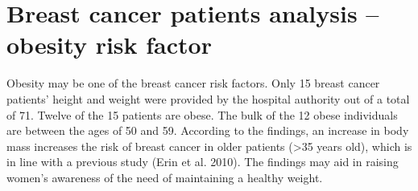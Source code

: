 \documentclass[10pt,a4paper,twoside]{article}
\begin{document}
\section{Breast cancer patients analysis – obesity risk factor}

Obesity may be one of the breast cancer risk factors.
Only 15 breast cancer patients' height and weight were provided by the hospital authority out of a total of 71. Twelve of the 15 patients are obese. The bulk of the 12 obese individuals are between the ages of 50 and 59. According to the findings, an increase in body mass increases the risk of breast cancer in older patients (>35 years old), which is in line with a previous study (Erin et al. 2010). The findings may aid in raising women's awareness of the need of maintaining a healthy weight.
\end{document}
